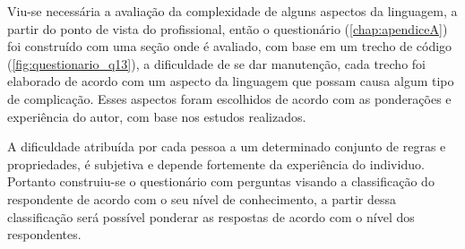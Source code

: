 Viu-se necessária a avaliação da complexidade de alguns aspectos da linguagem, a partir do ponto de vista do profissional, então o questionário (\autoref{chap:apendiceA}) foi construído com uma seção onde é avaliado, com base em um trecho de código (\autoref{fig:questionario_q13}), a dificuldade de se dar manutenção, cada trecho foi elaborado de acordo com um aspecto da linguagem que possam causa algum tipo de complicação. Esses aspectos foram escolhidos de acordo com as ponderações e experiência do autor, com base nos estudos realizados.

A dificuldade atribuída por cada pessoa a um determinado conjunto de regras e propriedades, é subjetiva e depende fortemente da experiência do individuo. Portanto construiu-se o questionário com perguntas visando a classificação do respondente de acordo com o seu nível de conhecimento, a partir dessa classificação será possível ponderar as respostas de acordo com o nível dos respondentes.